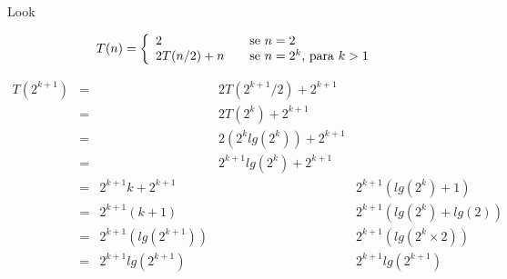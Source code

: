 \documentclass[12pt]{article}
\begin{document}
Look

\[ T(n) = \left\{
  \begin{array}{l l}
    2 & \quad \text{se } n=2 \\
    2T(n/2)+n & \quad \text{se } n=2^k \text{, para } k > 1
  \end{array} \right.\]



\begin{equation}
\begin{array}{lclcl}
T(2^{k+1}) & = & & 2T(2^{k+1}/2) + 2^{k+1} \\
 & = & & 2T(2^k) + 2^{k+1} \\
 & = & & 2(2^klg(2^k)) + 2^{k+1} \\
 & = & & 2^{k+1}lg(2^k) + 2^{k+1} \\
 & = & 2^{k+1}k + 2^{k+1} & &  2^{k+1}(lg(2^k) + 1) \\
 & = & 2^{k+1}(k + 1) & & 2^{k+1}(lg(2^k) + lg(2)) \\
 & = & 2^{k+1}(lg(2^{k + 1})) & & 2^{k+1}(lg(2^k \times 2)) \\
 & = & 2^{k+1}lg(2^{k+1}) & & 2^{k+1}lg(2^{k+1})
\end{array}
\end{equation}
\end{document}
